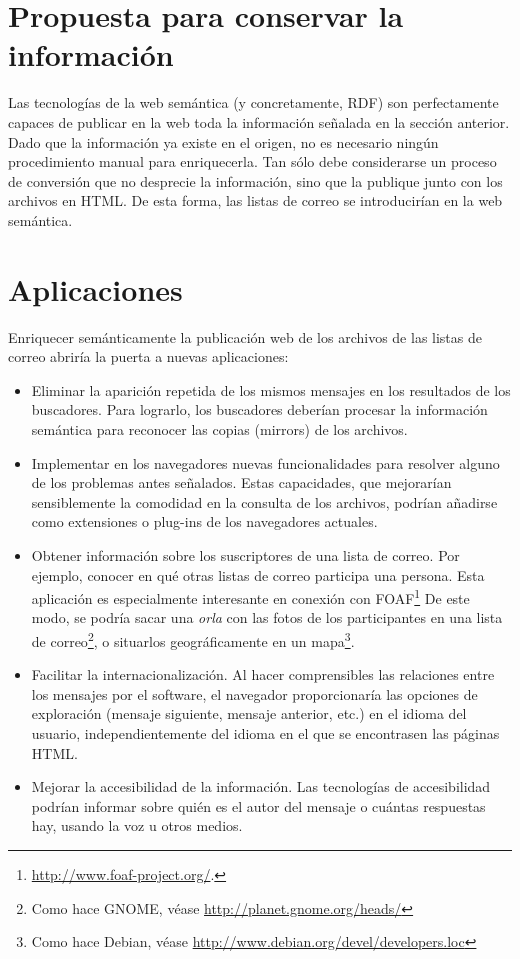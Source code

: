 \section*{Propuesta para conservar la información}

Las tecnologías de la web semántica (y concretamente, RDF) son perfectamente
capaces de publicar en la web toda la información señalada en la sección
anterior. Dado que la información ya existe en el origen, no es necesario 
ningún procedimiento manual para enriquecerla. Tan sólo debe considerarse un 
proceso de conversión que no desprecie la información, sino que la publique 
junto con los archivos en HTML. De esta forma, las listas de correo se 
introducirían en la web semántica.

\section*{Aplicaciones}

Enriquecer semánticamente la publicación web de los archivos de las listas
de correo abriría la puerta a nuevas aplicaciones:

\begin{itemize}
  \item Eliminar la aparición repetida de los mismos mensajes en los resultados
 	de los buscadores. Para lograrlo, los buscadores deberían procesar la 
	información semántica para reconocer las copias (mirrors) de los archivos.
  \item Implementar en los navegadores nuevas funcionalidades para resolver alguno
	de los problemas antes señalados. Estas capacidades, que mejorarían 
	sensiblemente la comodidad en la consulta de los archivos, podrían añadirse 
	como extensiones o plug-ins de los navegadores actuales.
  \item Obtener información sobre los suscriptores de una lista de correo. Por 
	ejemplo, conocer en qué otras listas de correo participa una persona. 
	Esta aplicación es especialmente interesante en conexión con 
	FOAF\footnote{\url{http://www.foaf-project.org/}.} De este modo, se 
	podría sacar una \emph{orla} con las fotos de los participantes en una 
	lista de correo\footnote{Como hace GNOME, véase 
	\url{http://planet.gnome.org/heads/}}, o situarlos geográficamente en un 
	mapa\footnote{Como hace Debian, 
	véase \url{http://www.debian.org/devel/developers.loc}}.
  \item Facilitar la internacionalización. Al hacer comprensibles las relaciones entre 
	los mensajes por el software, el navegador proporcionaría las opciones de 
	exploración (mensaje siguiente, mensaje anterior, etc.) en el idioma del 
	usuario, independientemente del idioma en el que se encontrasen las páginas 
	HTML.
  \item Mejorar la accesibilidad de la información. Las tecnologías de accesibilidad 
	podrían informar sobre quién es el autor del mensaje o cuántas respuestas hay, 
	usando la voz u otros medios.
\end{itemize}

